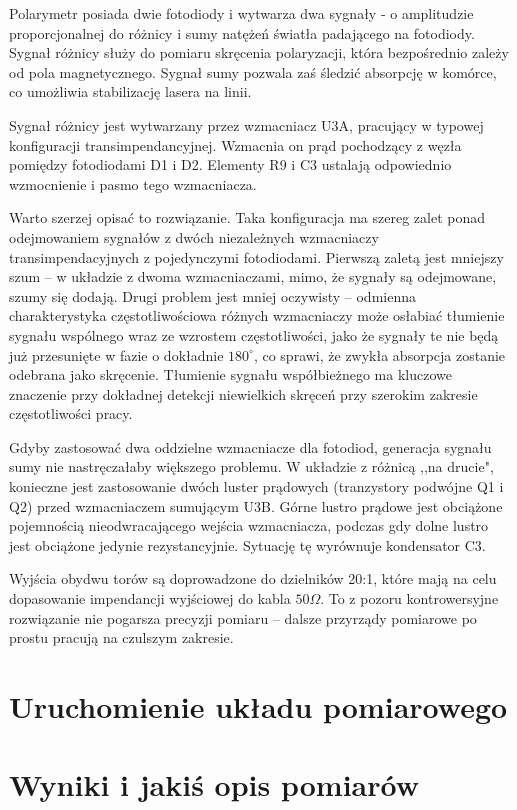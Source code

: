 \documentclass[a4paper,10pt]{article}
\begin{document}
Polarymetr posiada dwie fotodiody i wytwarza dwa sygnały - o amplitudzie proporcjonalnej do różnicy i sumy natężeń światła padającego na fotodiody.
Sygnał różnicy służy do pomiaru skręcenia polaryzacji, która bezpośrednio zależy od pola magnetycznego.  Sygnał sumy pozwala zaś śledzić absorpcję w komórce, co umożliwia stabilizację lasera na linii.

Sygnał różnicy jest wytwarzany przez wzmacniacz U3A, pracujący w typowej konfiguracji transimpendancyjnej. Wzmacnia on prąd pochodzący z węzła pomiędzy fotodiodami D1 i D2.
Elementy R9 i C3 ustalają odpowiednio wzmocnienie i pasmo tego wzmacniacza.

Warto szerzej opisać to rozwiązanie. Taka konfiguracja ma szereg zalet ponad odejmowaniem sygnałów z dwóch niezależnych wzmacniaczy transimpendacyjnych z pojedynczymi fotodiodami.
Pierwszą zaletą jest mniejszy szum -- w układzie z dwoma wzmacniaczami, mimo, że sygnały są odejmowane, szumy się dodają. Drugi problem jest mniej oczywisty -- odmienna charakterystyka częstotliwościowa różnych wzmacniaczy może osłabiać tłumienie sygnału wspólnego wraz ze wzrostem częstotliwości, jako że sygnały te nie będą już przesunięte w fazie o dokładnie $180^{\circ}$, co sprawi, że zwykła absorpcja zostanie odebrana jako skręcenie. Tłumienie sygnału współbieżnego ma kluczowe znaczenie przy dokładnej detekcji niewielkich skręceń przy szerokim zakresie częstotliwości pracy.

Gdyby zastosować dwa oddzielne wzmacniacze dla fotodiod, generacja sygnału sumy nie nastręczałaby większego problemu. W układzie z różnicą ,,na drucie", konieczne jest zastosowanie dwóch luster prądowych (tranzystory podwójne Q1 i Q2) przed wzmacniaczem sumującym U3B. Górne lustro prądowe jest obciążone pojemnością nieodwracającego wejścia wzmacniacza, podczas gdy dolne lustro jest obciążone jedynie rezystancyjnie. Sytuację tę wyrównuje kondensator C3. 

Wyjścia obydwu torów są doprowadzone do dzielników 20:1, które mają na celu dopasowanie impendancji wyjściowej do kabla $50\Omega$. To z pozoru kontrowersyjne rozwiązanie nie pogarsza precyzji pomiaru -- dalsze przyrządy pomiarowe po prostu pracują na czulszym zakresie.

\section{Uruchomienie układu pomiarowego}


\section{Wyniki i jakiś opis pomiarów}
\end{document}

